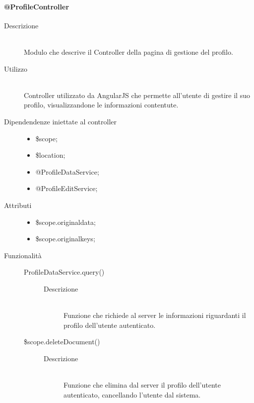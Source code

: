 \paragraph{@ProfileController}
\begin{description}
 \item[Descrizione] \hfill \\
 Modulo che descrive il Controller della pagina di gestione del profilo.
 
 \item[Utilizzo] \hfill \\
 Controller utilizzato da AngularJS che permette all'utente di gestire il suo profilo, visualizzandone le informazioni contentute.
 
 \item[Dipendendenze iniettate al controller] \hfill 
 \begin{itemize}
  \item \$scope;
  \item \$location;
  \item @ProfileDataService;
  \item @ProfileEditService;
  
 \end{itemize}
 
 \item[Attributi] \hfill 
 \begin{itemize}
 \item \$scope.original\textunderscore data;
 \item \$scope.original\textunderscore keys;

 \end{itemize}
 
 \item[Funzionalità] \hfill 
 \begin{description}
  \item[ProfileDataService.query()] \hfill 
   \begin{description}
  	\item[Descrizione] \hfill \\
	Funzione che richiede al server le informazioni riguardanti il profilo dell'utente autenticato.
	\end{description}
	
	 \item[\$scope.deleteDocument()] \hfill
	 
	 \begin{description}
	 	\item[Descrizione] \hfill \\	 
  Funzione che elimina dal server il profilo dell'utente autenticato, cancellando l'utente dal sistema.
  	 \end{description}

  \end{description}
  
  
\end{description}

